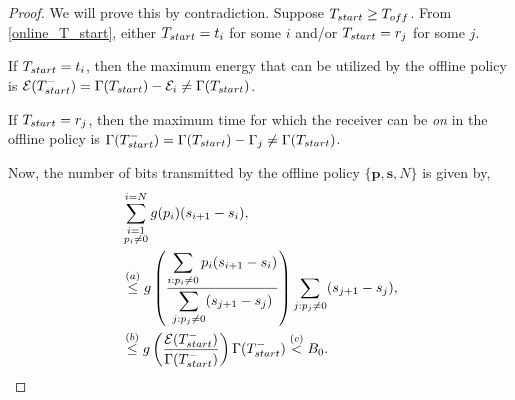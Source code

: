 \begin{proof}
We will prove this by contradiction. Suppose $T_{\mbox{\scriptsize{start}}} \ge T_{\mbox{\scriptsize{off}}}$. From \eqref{online_T_start}, either $T_{\mbox{\scriptsize{start}}}=t_i$ for some $i$ and/or $T_{\mbox{\scriptsize{start}}}=r_j$ for some $j$.

If $T_{\mbox{\scriptsize{start}}}=t_i$, then %
the maximum energy that can be utilized by the offline policy is $\ETx(T_{\mbox{\scriptsize{start}}}^-)=\TRx(T_{\mbox{\scriptsize{start}}})-\ETx_i\neq \TRx(T_{\mbox{\scriptsize{start}}})$.

If $T_{\mbox{\scriptsize{start}}}=r_j$, then the maximum time for which the receiver can be \textit{on} in the offline policy is $\TRx(T_{\mbox{\scriptsize{start}}}^-)=\TRx(T_{\mbox{\scriptsize{start}}})-\TRx_j\neq \TRx(T_{\mbox{\scriptsize{start}}})$.


Now, the number of bits transmitted by the offline policy $\{\bm{p},\bm{s},N\}$ is given by,
\begin{align}
&\sum_{{\substack{i=1\\p_i\neq 0}}}^{i=N} g(p_i)(s_{i+1}-s_{i}),
\\
&\nonumber \stackrel{(a)}{\le}g\left(\frac{\displaystyle\sum_{i:p_i\neq 0}p_i(s_{i+1}-s_{i})}{\displaystyle\sum_{j:p_j\neq 0}(s_{j+1}-s_{j})}\right)\sum_{j:p_j\neq 0} (s_{j+1}-s_{j}),
\\
&\stackrel{(b)}\le g\left(\frac{\ETx(T_{\mbox{\scriptsize{start}}}^-)}{\TRx(T_{\mbox{\scriptsize{start}}}^-)}\right)\TRx(T_{\mbox{\scriptsize{start}}}^-)\stackrel{(c)}{<}B_0.\label{online_eq_2}
\end{align}


\end{proof}
